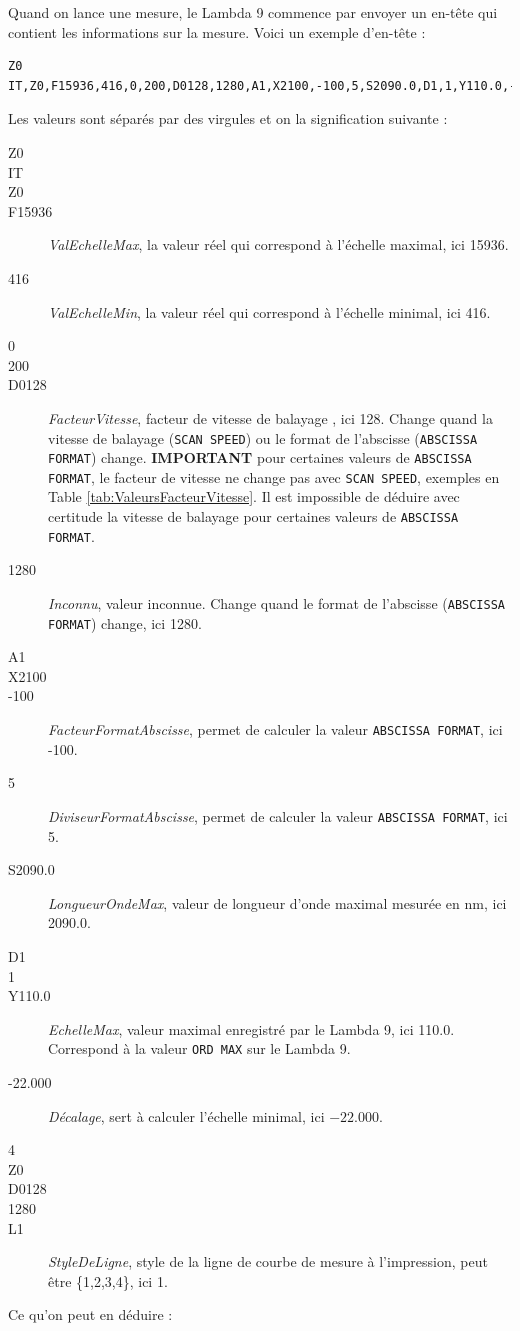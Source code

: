 \documentclass[a4paper, 12pt]{article}
\begin{document}
Quand on lance une mesure, le Lambda 9 commence par envoyer un en-tête qui contient les informations sur la mesure.
Voici un exemple d'en-tête :
\begin{lstlisting}
Z0
IT,Z0,F15936,416,0,200,D0128,1280,A1,X2100,-100,5,S2090.0,D1,1,Y110.0,-22.000,4,Z0,D0128,1280,L1
\end{lstlisting}
Les valeurs sont séparés par des virgules et on la signification suivante :
\begin{description}
	\item[Z0]
	\item[IT]
	\item[Z0]
	\item[F15936] \emph{ValEchelleMax}, la valeur réel qui correspond à l'échelle maximal, ici 15936.
	\item[416] \emph{ValEchelleMin}, la valeur réel qui correspond à l'échelle minimal, ici 416.
	\item[0]
	\item[200]
	\item[D0128]  \emph{FacteurVitesse}, facteur de vitesse de balayage , ici 128.
		Change quand la vitesse de balayage (\verb|SCAN SPEED|) ou le format de l'abscisse (\verb|ABSCISSA FORMAT|) change.
		\textbf{IMPORTANT} pour certaines valeurs de \verb|ABSCISSA FORMAT|, le facteur de vitesse ne change pas avec \verb|SCAN SPEED|, exemples en Table \ref{tab:ValeursFacteurVitesse}.
		Il est impossible de déduire avec certitude la vitesse de balayage pour certaines valeurs de \verb|ABSCISSA FORMAT|.
	\item[1280] \emph{Inconnu}, valeur inconnue.
		Change quand le format de l'abscisse (\verb|ABSCISSA FORMAT|) change, ici 1280.
	\item[A1]
	\item[X2100]
	\item[-100] \emph{FacteurFormatAbscisse}, permet de calculer la valeur \verb|ABSCISSA FORMAT|, ici -100.
	\item[5] \emph{DiviseurFormatAbscisse}, permet de calculer la valeur \verb|ABSCISSA FORMAT|, ici 5.
	\item[S2090.0] \emph{LongueurOndeMax}, valeur de longueur d'onde maximal mesurée en nm, ici 2090.0.
	\item[D1]
	\item[1]
	\item[Y110.0] \emph{EchelleMax}, valeur maximal enregistré par le Lambda 9, ici 110.0.
		Correspond à la valeur \verb|ORD MAX| sur le Lambda 9.
	\item[-22.000] \emph{Décalage}, sert à calculer l'échelle minimal, ici $-22.000$.
	\item[4]
	\item[Z0]
	\item[D0128]
	\item[1280]
	\item[L1] \emph{StyleDeLigne}, style de la ligne de courbe de mesure à l'impression, peut être \{1,2,3,4\}, ici 1.

\end{description}
Ce qu'on peut en déduire :
\end{document}
